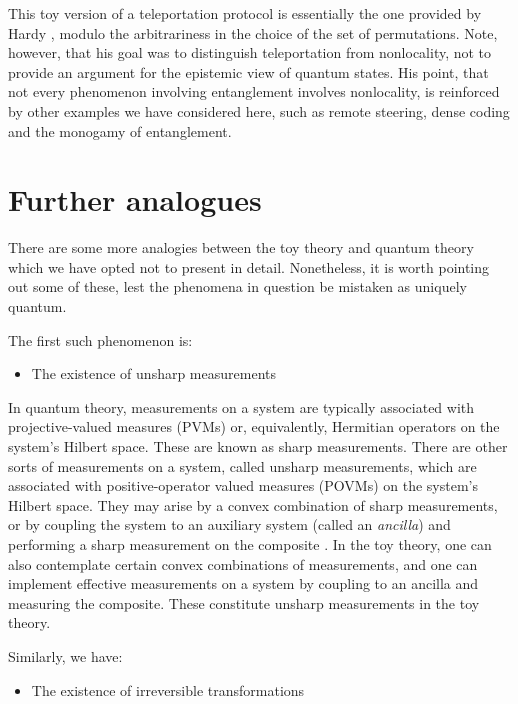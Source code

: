 \documentclass[pra,twocolumn,nofootinbib,showpacs]{revtex4}
\begin{document}
This toy version of a teleportation protocol is essentially the
one provided by Hardy \cite{Hardydisentangling}, modulo the
arbitrariness in the choice of the set of permutations. Note,
however, that his goal was to distinguish teleportation from
nonlocality, not to provide an argument for the epistemic view of
quantum states. His point, that not every phenomenon involving
entanglement involves nonlocality, is reinforced by other examples
we have considered here, such as remote steering, dense coding and
the monogamy of entanglement.

\section{Further analogues}

\label{otheranalogues}

There are some more analogies between the toy theory and quantum theory
which we have opted not to present in detail. Nonetheless, it is worth
pointing out some of these, lest the phenomena in question be mistaken as
uniquely quantum.

The first such phenomenon is:

\begin{itemize}
\item The existence of unsharp measurements
\end{itemize}

In quantum theory, measurements on a system are typically associated with
projective-valued measures (PVMs) or, equivalently, Hermitian operators on
the system's Hilbert space. These are known as sharp measurements. There are
other sorts of measurements on a system, called unsharp measurements, which
are associated with positive-operator valued measures (POVMs) on the
system's Hilbert space. They may arise by a convex combination of sharp
measurements, or by coupling the system to an auxiliary system (called an
\emph{ancilla}) and performing a sharp measurement on the composite \cite%
{NielsenChuang}. In the toy theory, one can also contemplate certain convex
combinations of measurements, and one can implement effective measurements
on a system by coupling to an ancilla and measuring the composite. These
constitute unsharp measurements in the toy theory.

Similarly, we have:

\begin{itemize}
\item The existence of irreversible transformations
\end{itemize}
\end{document}
